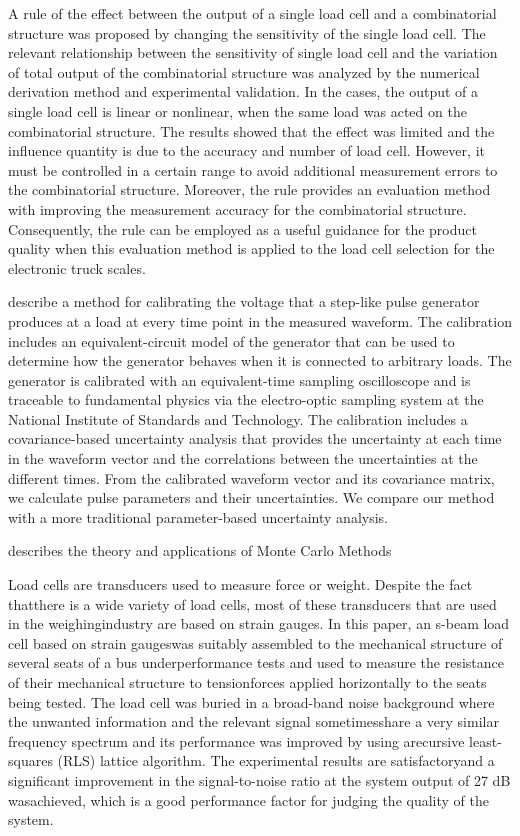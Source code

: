 \documentclass[11pt]{article}
\begin{document}
\citet{Guo18} A rule of the effect between the output of a single load cell and a combinatorial structure was proposed by changing the sensitivity of the single load cell. The relevant relationship between the sensitivity of single load cell and the variation of total output of the combinatorial structure was analyzed by the numerical derivation method and experimental validation. In the cases, the output of a single load cell is linear or nonlinear, when the same load was acted on the combinatorial structure. The results showed that the effect was limited and the influence quantity is due to the accuracy and number of load cell. However, it must be controlled in a certain range to avoid additional measurement errors to the combinatorial structure. Moreover, the rule provides an evaluation method with improving the measurement accuracy for the combinatorial structure. Consequently, the rule can be employed as a useful guidance for the product quality when this evaluation method is applied to the load cell selection for the electronic truck scales.

\citet{Hale09} describe a method for calibrating the voltage that a step-like pulse generator produces at a load at every time point in the measured waveform. The calibration includes an equivalent-circuit model of the generator that can be used to determine how the generator behaves when it is connected to arbitrary loads. The generator is calibrated with an equivalent-time sampling oscilloscope and is traceable to fundamental physics via the electro-optic sampling system at the National Institute of Standards and Technology. The calibration includes a covariance-based uncertainty analysis that provides the uncertainty at each time in the waveform vector and the correlations between the uncertainties at the different times. From the calibrated waveform vector and its covariance matrix, we calculate pulse parameters and their uncertainties. We compare our method with a more traditional parameter-based uncertainty analysis.

\citet{Hammersley75} describes the theory and applications of  Monte Carlo Methods

\citet{Hernandez06} Load cells are transducers used to measure force or weight. Despite the fact thatthere is a wide variety of load cells, most of these transducers that are used in the weighingindustry are based on strain gauges. In this paper, an s-beam load cell based on strain gaugeswas suitably assembled to the mechanical structure of several seats of a bus underperformance tests and used to measure the resistance of their mechanical structure to tensionforces applied horizontally to the seats being tested. The load cell was buried in a broad-band noise background where the unwanted information and the relevant signal sometimesshare a very similar frequency spectrum and its performance was improved by using arecursive least-squares (RLS) lattice algorithm. The experimental results are satisfactoryand a significant improvement in the signal-to-noise ratio at the system output of 27 dB wasachieved, which is a good performance factor for judging the quality of the system.
\end{document}
